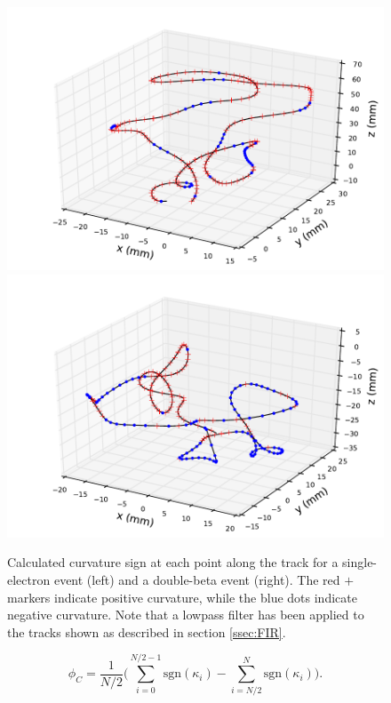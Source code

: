 \documentclass{JINST}
\begin{document}
\begin{figure}[!htb]
	\includegraphics[scale=0.48]{fig/plt_trkcurv_nmagse2_6.pdf}
	\includegraphics[scale=0.48]{fig/plt_trkcurv_nmagbb2_2.pdf}
	\caption{\label{fig_trkcurv}Calculated curvature sign at each point along the track for a single-electron event (left) and a double-beta event (right).  The red $+$ markers indicate positive curvature, while the blue dots indicate negative curvature.  Note that a lowpass filter has been applied to the tracks shown as described in section \protect\ref{ssec:FIR}.}
\end{figure}

\begin{equation}\label{eqn_assym}
\phi_{C} = \frac{1}{N/2}\Biggl(\sum_{i=0}^{N/2-1}\mathrm{sgn}(\kappa_{i}) - \sum_{i=N/2}^{N}\mathrm{sgn}(\kappa_{i})\Biggr).
\end{equation}
\end{document}
